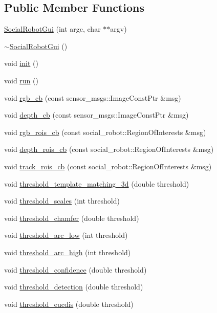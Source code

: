 \subsection*{Public Member Functions}
\begin{DoxyCompactItemize}
\item 
\hyperlink{classSocialRobotGui_a5eaed12731bfb6967d261ae8433d2110}{Social\-Robot\-Gui} (int argc, char $\ast$$\ast$argv)
\item 
\hyperlink{classSocialRobotGui_afd21dde21c5d13e302cec9edda1e9abc}{$\sim$\-Social\-Robot\-Gui} ()
\item 
void \hyperlink{classSocialRobotGui_a3a979f567341925976347b3c1b735347}{init} ()
\item 
void \hyperlink{classSocialRobotGui_ac9171915901ff625cfbc1492ee8f267e}{run} ()
\item 
void \hyperlink{classSocialRobotGui_adeb531e38774a69cf8411aa18d2af8e2}{rgb\-\_\-cb} (const sensor\-\_\-msgs\-::\-Image\-Const\-Ptr \&msg)
\item 
void \hyperlink{classSocialRobotGui_a20bf403e17980a1c2d9f3efaf99a0ddd}{depth\-\_\-cb} (const sensor\-\_\-msgs\-::\-Image\-Const\-Ptr \&msg)
\item 
void \hyperlink{classSocialRobotGui_aac3a124449c975e2bc69fbc71d891e16}{rgb\-\_\-rois\-\_\-cb} (const social\-\_\-robot\-::\-Region\-Of\-Interests \&msg)
\item 
void \hyperlink{classSocialRobotGui_a0c36cf4cb20fec7ec4d79abeb04b140d}{depth\-\_\-rois\-\_\-cb} (const social\-\_\-robot\-::\-Region\-Of\-Interests \&msg)
\item 
void \hyperlink{classSocialRobotGui_a3333bd4377889eb97216ebfbb10f8104}{track\-\_\-rois\-\_\-cb} (const social\-\_\-robot\-::\-Region\-Of\-Interests \&msg)
\item 
void \hyperlink{classSocialRobotGui_a77d605da08f98863b272ccef00b42666}{threshold\-\_\-template\-\_\-matching\-\_\-3d} (double threshold)
\item 
void \hyperlink{classSocialRobotGui_a5f6fedb5046ca5cc46c021cca4778385}{threshold\-\_\-scales} (int threshold)
\item 
void \hyperlink{classSocialRobotGui_a35d2e5e74b8e201cb269e8dd3c1b8dab}{threshold\-\_\-chamfer} (double threshold)
\item 
void \hyperlink{classSocialRobotGui_acdabf6f9c428cca8e0c0b74bd9035b82}{threshold\-\_\-arc\-\_\-low} (int threshold)
\item 
void \hyperlink{classSocialRobotGui_a5108ee2ec82ffc7561421e5c8576cef4}{threshold\-\_\-arc\-\_\-high} (int threshold)
\item 
void \hyperlink{classSocialRobotGui_a2345763f68b3da1cff958a9a24218da6}{threshold\-\_\-confidence} (double threshold)
\item 
void \hyperlink{classSocialRobotGui_a9931a08dd5eda16aa454d6edccdfb015}{threshold\-\_\-detection} (double threshold)
\item 
void \hyperlink{classSocialRobotGui_ac701acad18c8d5d0358886765ba8abb9}{threshold\-\_\-eucdis} (double threshold)
\end{DoxyCompactItemize}
